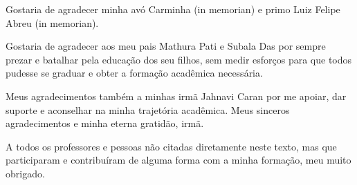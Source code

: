 \begin{agradecimentos}
	Gostaria de agradecer minha avó Carminha (in memorian) e primo Luiz Felipe Abreu (in memorian).

			Gostaria de agradecer aos meu pais Mathura Pati e Subala Das por sempre prezar e batalhar pela educação dos seu filhos, sem medir esforços para que todos pudesse se graduar e obter a formação acadêmica necessária.

			Meus agradecimentos também a minhas irmã Jahnavi Caran por me apoiar, dar suporte e aconselhar na minha trajetória acadêmica. Meus sinceros agradecimentos e minha eterna gratidão, irmã.


			A todos os professores e pessoas não citadas diretamente neste texto, mas que participaram e contribuíram de alguma forma com a minha formação, meu muito obrigado.
\end{agradecimentos}

%
